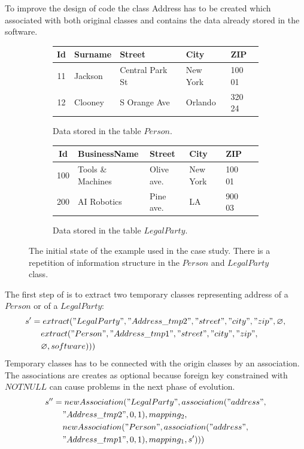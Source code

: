 \documentclass[runningheads]{comsis}
\begin{document}
To improve the design of code the class Address has to be created which associated with both original classes and contains the data already stored in the software. 
\begin{figure}
\begin{subfigure}[b]{\textwidth}
	\centering
	\begin{tabular}{| c | l | l | l | l | }
	 	\hline
		Id &  Surname & Street & City & ZIP  \\ \hline  
		11 & Jackson & Central Park St & New York & 100 01  \\ \hline
		12 & Clooney & S Orange Ave & Orlando & 320 24  \\ \hline
	\end{tabular}
	\caption{Data stored in the table $Person$.}
\end{subfigure}
\begin{subfigure}[b]{\textwidth}
	\centering
	\begin{tabular}{| c | l | l | l | l | c |}
	 	\hline
		Id &  BusinessName & Street & City & ZIP \\ \hline  
		100 & Tools \& Machines & Olive ave. & New York & 100 01 \\ \hline
		200 & AI Robotics & Pine ave. & LA & 900 03  \\ \hline
	\end{tabular}
	\caption{Data stored in the table $LegalParty$.}
\end{subfigure}
	\caption{The initial state of the example used in the case study. There is a repetition of information structure in the $Person$ and $LegalParty$ class.}
	\label{fig:case1}
\end{figure}
The first  step of is to extract two temporary classes representing address of a $Person$ or of a $LegalParty$:
\begin{align}
s' &= extract("LegalParty",  "Address\_tmp2", "street", "city", "zip", \varnothing, \nonumber  \\ 
& \;\;\;\; extract("Person", "Address\_tmp1", "street", "city", "zip", \nonumber \\ & \;\;\;\;  \varnothing, software)))
\end{align}
Temporary classes has to be connected with the origin classes by an association. The associations are creates as optional because foreign key constrained with $NOTNULL$ can cause problems in the next phase of evolution.
\begin{align}
 s'' &= newAssociation("LegalParty", association("address", \nonumber \\
& \;\;\;\; "Address\_tmp2", 0, 1), mapping_2, \nonumber \\ & \;\;\;\; newAssociation("Person", association("address",\nonumber  \\
& \;\;\;\; "Address\_tmp1", 0, 1), mapping_1, s')))
\end{align}
\end{document}
